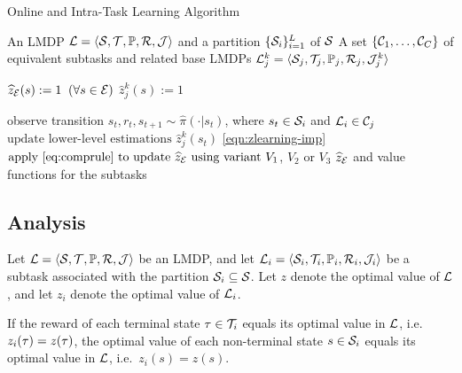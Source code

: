 \begin{algorithm}[!htb]
\caption{Online and Intra-Task Learning Algorithm}
\begin{algorithmic}[1]
 An LMDP ${\mathcal{L} = \langle \mathcal{S}, \mathcal{T}, \mathbb{P}, \mathcal{R}, \mathcal{J} \rangle}$ and
a partition $\{\mathcal{S}_i\}_{i=1}^L$ of $\mathcal{S}$ \newline
A set $\{\mathcal{C}_1,\ldots,\mathcal{C}_C\}$ of equivalent subtasks and related base LMDPs $\linebreak\mathcal{L}_j^k = \langle \cS_j, \cT_j, \kernel_j, \cR_j, \cJ_j^k \rangle$

 \newline
$\widehat z_{\mathcal{E}}(s) := 1 \;\; (\forall s \in \mathcal{E})$  \newline
$\widehat z_j^k(s) := 1$ 

\State observe transition $s_t, r_t, s_{t+1} \sim \widehat\pi(\cdot|s_{t})$, where $s_t\in\mathcal{S}_i$ and $\mathcal{L}_i\in\mathcal{C}_j$
\State $\text{update lower-level estimations } \widehat z_j^k(s_t)$  \eqref{eqn:zlearning-imp}
\State $\text{apply \eqref{eq:comprule} to update $\widehat z_{\mathcal{E}}$ using variant } V_1$, $V_2$ or $V_3$
\EndIf
\EndWhile
\State \Return $\widehat z_{\mathcal{E}}$ and value functions for the subtasks
\end{algorithmic}
\label{alg:online_hlmdps}
\end{algorithm}
\subsection{Analysis}
Let $\mathcal{L}=\langle\mathcal{S},\mathcal{T},\mathbb{P},\mathcal{R},\mathcal{J}\rangle$ be an LMDP, and let $\mathcal{L}_i=\langle\mathcal{S}_i,\mathcal{T}_i,\mathbb{P}_i,\mathcal{R}_i,\mathcal{J}_i\rangle$ be a subtask associated with the partition $\mathcal{S}_i\subseteq\mathcal{S}$. Let $z$ denote the optimal value of $\mathcal{L}$, and let $z_i$ denote the optimal value of $\mathcal{L}_i$.

\begin{lemma}\label{lemma:same}
If the reward of each terminal state $\tau\in\mathcal{T}_i$ equals its optimal value in $\mathcal{L}$, i.e.~$z_i(\tau)=z(\tau)$, the optimal value of each non-terminal state $s\in\mathcal{S}_i$ equals its optimal value in $\mathcal{L}$, i.e.~$z_i(s)=z(s)$.
\end{lemma}

